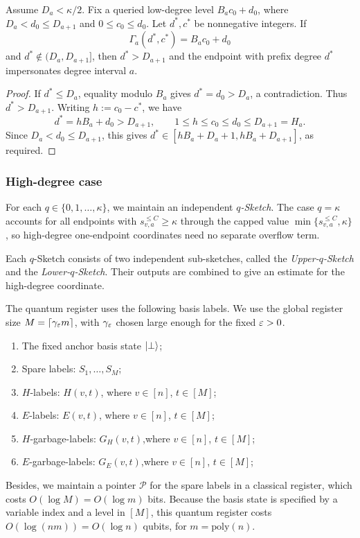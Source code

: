 \begin{lemma}[Impersonation]\label{lem:low-degree-singleton-impersonation}
Assume $D_a<\kappa/2$. Fix a queried low-degree level $B_a c_0 +d_0$, where $D_a<d_0\le D_{a+1}$ and $0\le c_0 \le d_0$. Let $d^\ast,c^\ast$ be nonnegative integers. If
\[
\Gamma_a(d^\ast,c^\ast)=B_a c_0 +d_0
\]
and $d^\ast\notin(D_a,D_{a+1}]$, then $d^\ast>D_{a+1}$ and the endpoint with prefix degree $d^\ast$ impersonates degree interval $a$.
\end{lemma}

\begin{proof}
If $d^\ast\le D_a$, equality modulo $B_a$ gives $d^\ast=d_0>D_a$, a contradiction. Thus $d^\ast>D_{a+1}$. Writing $h:=c_0-c^\ast$, we have
\[
d^\ast=hB_a+d_0>D_{a+1},\qquad
1\le h\le c_0\le d_0\le D_{a+1}=H_a.
\]
Since $D_a<d_0\le D_{a+1}$, this gives
$d^\ast\in[hB_a+D_a+1,hB_a+D_{a+1}]$, as required.
\end{proof}

\subsubsection{High-degree case} \label{sec:highdegree}

For each $q\in\{0,1,\ldots,\kappa\}$, we maintain an independent
\textit{$q$-Sketch}. The case $q=\kappa$ accounts for all endpoints with
$s_{v,a}^{\le C}\ge\kappa$ through the capped value
$\min\{s_{v,a}^{\le C},\kappa\}$, so high-degree one-endpoint coordinates need no
separate overflow term.

Each $q$-Sketch consists of two independent sub-sketches, called the \textit{Upper-$q$-Sketch} and the \textit{Lower-$q$-Sketch}. Their outputs are combined to give an estimate for the high-degree coordinate.

The quantum register uses the following basis labels. We use the global register size $M=\lceil \gamma_\varepsilon m\rceil$, with $\gamma_\varepsilon$ chosen large enough for the fixed $\varepsilon>0$.
\begin{enumerate}
    \item The fixed anchor basis state $\ket{\bot}$;
    \item Spare labels: $S_1,\ldots, S_M$;
    \item $H$-labels: $H(v,t)$, where $v\in [n]$, $t\in [M]$;
    \item $E$-labels: $E(v,t)$, where $v\in [n]$, $t\in [M]$;
    \item $H$-garbage-labels: $G_{H}(v,t)$,where $v\in [n]$, $t\in [M]$;
    \item $E$-garbage-labels: $G_{E}(v,t)$,where $v\in [n]$, $t\in [M]$;
\end{enumerate}
Besides, we maintain a pointer $\mathcal{P}$ for the spare labels in a classical register, which costs $O(\log M)=O(\log m)$ bits. Because the basis state is specified by a variable index and a level in $[M]$, this quantum register costs $O(\log (nm))=O(\log n )$ qubits, for $m=\mathrm{poly} (n)$.

